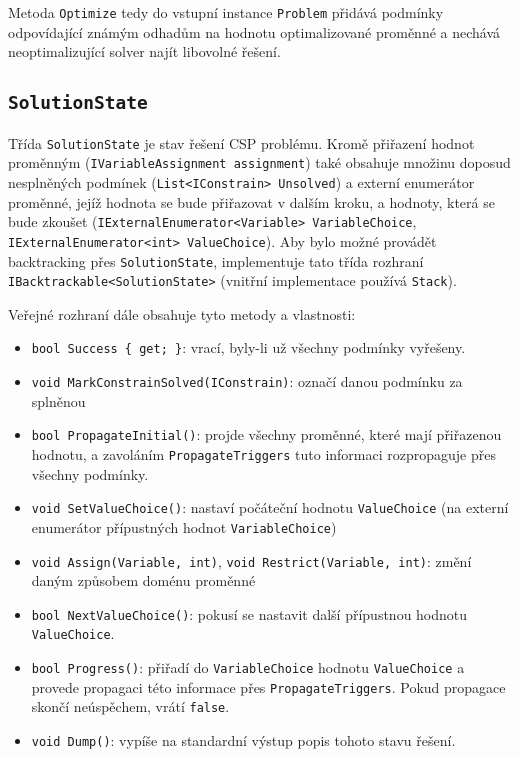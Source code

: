\documentclass[a4paper]{article}
\begin{document}
Metoda \texttt{Optimize} tedy do vstupní instance \texttt{Problem} přidává
podmínky odpovídající známým odhadům na hodnotu optimalizované proměnné a
nechává neoptimalizující solver najít libovolné řešení.

\subsection{\texttt{SolutionState}}
Třída \texttt{SolutionState} je stav řešení CSP problému. Kromě přiřazení hodnot
proměnným (\texttt{IVariableAssignment assignment}) také obsahuje množinu doposud nesplněných podmínek
(\texttt{List<IConstrain> Unsolved}) a externí enumerátor proměnné, jejíž
hodnota se bude přiřazovat v dalším kroku, a hodnoty, která se bude zkoušet (\texttt{IExternalEnumerator<Variable>
VariableChoice},\\ \texttt{IExternalEnumerator<int> ValueChoice}).
Aby bylo možné provádět backtracking přes \texttt{SolutionState}, implementuje
tato třída rozhraní \texttt{IBacktrackable<SolutionState>} (vnitřní implementace
používá \texttt{Stack}).

Veřejné rozhraní dále obsahuje tyto metody a vlastnosti:
\begin{itemize}
\item \texttt{bool Success \{ get; \}}: vrací, byly-li už všechny
	podmínky vyřešeny.
\item \texttt{void MarkConstrainSolved(IConstrain)}: označí danou podmínku za
	splněnou
\item \texttt{bool PropagateInitial()}: projde všechny proměnné, které mají
	přiřazenou hodnotu, a zavoláním \texttt{PropagateTriggers} tuto informaci
	rozpropaguje přes všechny podmínky.
\item \texttt{void SetValueChoice()}: nastaví počáteční hodnotu
	\texttt{ValueChoice} (na externí enumerátor přípustných hodnot
	\texttt{VariableChoice})
\item \texttt{void Assign(Variable, int)}, \texttt{void Restrict(Variable,
	int)}: změní daným způsobem doménu proměnné
\item \texttt{bool NextValueChoice()}: pokusí se nastavit další přípustnou
	hodnotu \texttt{ValueChoice}.
\item \texttt{bool Progress()}: přiřadí do \texttt{VariableChoice} hodnotu
	\texttt{ValueChoice} a provede propagaci této informace přes
	\texttt{PropagateTriggers}. Pokud propagace skončí neúspěchem, vrátí
	\texttt{false}.
\item \texttt{void Dump()}: vypíše na standardní výstup popis tohoto stavu
	řešení.
\end{itemize}
\end{document}
